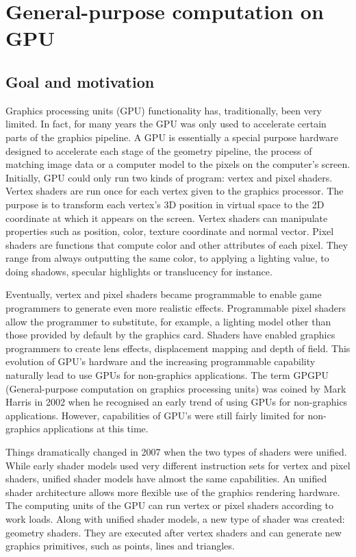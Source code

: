 \section{General-purpose computation on GPU}

	\subsection{Goal and motivation}
Graphics processing units (GPU) functionality has, traditionally, been very limited. In fact, for many years the GPU was only used to accelerate certain parts of the graphics pipeline. A GPU is essentially a special purpose hardware designed to accelerate each stage of the geometry pipeline, the process of matching image data or a computer model to the pixels on the computer's screen. Initially, GPU could only run two kinds of program: vertex and pixel shaders. Vertex shaders are run once for each vertex given to the graphics processor. The purpose is to transform each vertex's 3D position in virtual space to the 2D coordinate at which it appears on the screen. Vertex shaders can manipulate properties such as position, color, texture coordinate and normal vector. Pixel shaders are functions that compute color and other attributes of each pixel. They range from always outputting the same color, to applying a lighting value, to doing shadows, specular highlights or translucency for instance.

Eventually, vertex and pixel shaders became programmable to enable game programmers to generate even more realistic effects. Programmable pixel shaders allow the programmer to substitute, for example, a lighting model other than those provided by default by the graphics card. Shaders have enabled graphics programmers to create lens effects, displacement mapping and depth of field. This evolution of GPU's hardware and the increasing programmable capability naturally lead to use GPUs for non-graphics applications. The term GPGPU (General-purpose computation on graphics processing units) was coined by Mark Harris in 2002 when he recognised an early trend of using GPUs for non-graphics applications. However, capabilities of GPU's were still fairly limited for non-graphics applications at this time. 

Things dramatically changed in 2007 when the two types of shaders were unified. While early shader models used very different instruction sets for vertex and pixel shaders, unified shader models have almost the same capabilities. An unified shader architecture allows more flexible use of the graphics rendering hardware. The computing units of the GPU can run vertex or pixel shaders according to work loads. Along with unified shader models, a new type of shader was created: geometry shaders. They are executed after vertex shaders and can generate new graphics primitives, such as points, lines and triangles. 

